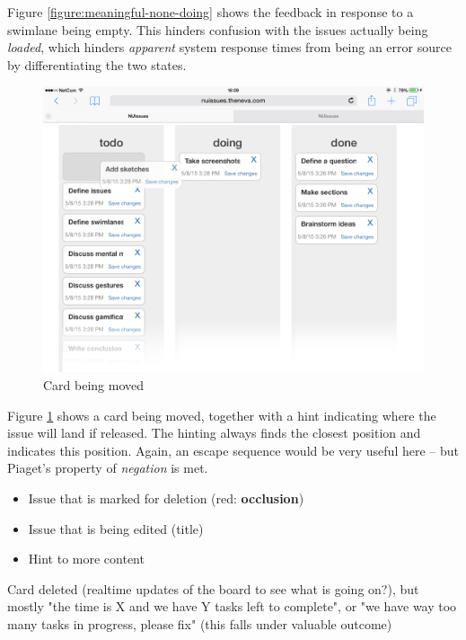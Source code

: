 Figure \ref{figure:meaningful-none-doing} shows the feedback in response to a swimlane being empty. This hinders confusion with the issues actually being \textit{loaded}, which hinders \textit{apparent} system response times from being an error source by differentiating the two states.

\begin{figure}[H]
    \centerline{\includegraphics[scale=0.4]{images/nuissues-screenshots/03-dragging-issue}}
    \caption{Card being moved}
    \label{figure:meaningful-card-moving}
\end{figure}

Figure \ref{figure:meaningful-card-moving} shows a card being moved, together with a hint indicating where the issue will land if released. The hinting always finds the closest position and indicates this position. Again, an escape sequence would be very useful here -- but Piaget's property of \textit{negation} is met.



\begin{itemize}
  \item Issue that is marked for deletion (red: \textbf{occlusion}) 
  \item Issue that is being edited (title)
  \item Hint to more content
\end{itemize}


Card deleted (realtime updates of the board to see what is going on?), but mostly "the time is X and we have Y tasks left to complete", or "we have way too many tasks in progress, please fix" (this falls under valuable outcome)


